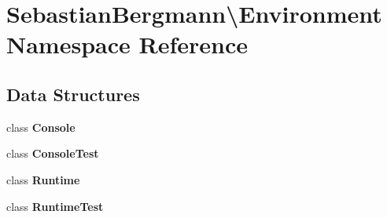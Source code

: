 \section{Sebastian\+Bergmann\textbackslash{}Environment Namespace Reference}
\label{namespace_sebastian_bergmann_1_1_environment}
\subsection*{Data Structures}
\begin{DoxyCompactItemize}
\item 
class {\bf Console}
\item 
class {\bf Console\+Test}
\item 
class {\bf Runtime}
\item 
class {\bf Runtime\+Test}
\end{DoxyCompactItemize}
